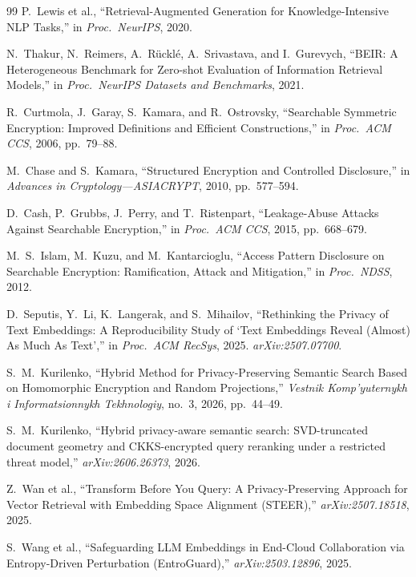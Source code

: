 \begin{thebibliography}{99}
 P.\ Lewis et al., ``Retrieval-Augmented Generation
for Knowledge-Intensive NLP Tasks,'' in \emph{Proc.\ NeurIPS}, 2020.

 N.\ Thakur, N.\ Reimers, A.\ R\"uckl\'e, A.\ Srivastava,
and I.\ Gurevych, ``BEIR: A Heterogeneous Benchmark for Zero-shot
Evaluation of Information Retrieval Models,'' in \emph{Proc.\ NeurIPS
Datasets and Benchmarks}, 2021.

 R.\ Curtmola, J.\ Garay, S.\ Kamara, and R.\ Ostrovsky,
``Searchable Symmetric Encryption: Improved Definitions and Efficient
Constructions,'' in \emph{Proc.\ ACM CCS}, 2006, pp.\ 79--88.

 M.\ Chase and S.\ Kamara, ``Structured Encryption
and Controlled Disclosure,'' in \emph{Advances in Cryptology---ASIACRYPT},
2010, pp.\ 577--594.

 D.\ Cash, P.\ Grubbs, J.\ Perry, and T.\
Ristenpart, ``Leakage-Abuse Attacks Against Searchable Encryption,'' in
\emph{Proc.\ ACM CCS}, 2015, pp.\ 668--679.

 M.\ S.\ Islam, M.\ Kuzu, and M.\ Kantarcioglu,
``Access Pattern Disclosure on Searchable Encryption: Ramification, Attack
and Mitigation,'' in \emph{Proc.\ NDSS}, 2012.

 D.\ Seputis, Y.\ Li, K.\ Langerak, and S.\
Mihailov, ``Rethinking the Privacy of Text Embeddings: A Reproducibility
Study of `Text Embeddings Reveal (Almost) As Much As Text','' in
\emph{Proc.\ ACM RecSys}, 2025. \emph{arXiv:2507.07700}.

 S.\ M.\ Kurilenko, ``Hybrid Method for
Privacy-Preserving Semantic Search Based on Homomorphic Encryption and
Random Projections,'' \emph{Vestnik Komp'yuternykh i Informatsionnykh
Tekhnologiy}, no.\ 3, 2026, pp.\ 44--49.

 S.\ M.\ Kurilenko, ``Hybrid privacy-aware semantic
search: SVD-truncated document geometry and CKKS-encrypted query reranking
under a restricted threat model,'' \emph{arXiv:2606.26373}, 2026.

\bibitem{ref_steer} Z.\ Wan et al., ``Transform Before You Query: A
Privacy-Preserving Approach for Vector Retrieval with Embedding Space
Alignment (STEER),'' \emph{arXiv:2507.18518}, 2025.

 S.\ Wang et al., ``Safeguarding LLM Embeddings in
End-Cloud Collaboration via Entropy-Driven Perturbation (EntroGuard),''
\emph{arXiv:2503.12896}, 2025.

\end{thebibliography}
